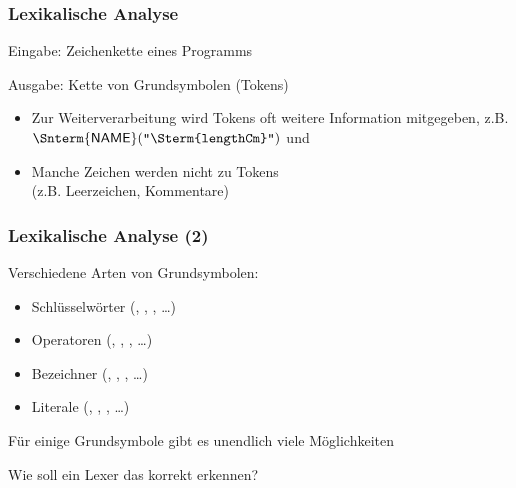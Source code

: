 \documentclass[aspectratio=1610,onlymath]{beamer}
\begin{document}
\begin{frame}\frametitle{Lexikalische Analyse}

\alert{Eingabe:} Zeichenkette eines Programms\\[1ex]

\alert{Ausgabe:} Kette von Grundsymbolen (Tokens)\\[1ex]

\begin{itemize}
\item Zur Weiterverarbeitung wird Tokens oft weitere Information mitgegeben,
	z.B. $\textsf{\Snterm{NAME}} (\texttt{"{}\Sterm{lengthCm}"{}})$ und 
\item Manche Zeichen werden nicht zu Tokens\\(z.B. Leerzeichen, Kommentare)
\end{itemize}

\end{frame}

\begin{frame}\frametitle{Lexikalische Analyse (2)}

Verschiedene Arten von Grundsymbolen:
\begin{itemize}
\item Schlüsselwörter (\texttt{}, \texttt{}, \texttt{}, \ldots)
\item Operatoren (\texttt{\Sterm{=}}, \texttt{\Sterm{+}}, \texttt{\Sterm{{>}{}{>}}}, \ldots)
\item Bezeichner (\texttt{}, \texttt{}, \texttt{}, \ldots)
\item Literale (\texttt{}, \texttt{}, \texttt{}, \ldots)
\end{itemize}
\medskip

Für einige Grundsymbole gibt es unendlich viele Möglichkeiten

Wie soll ein Lexer das korrekt erkennen?

\end{frame}
\end{document}
